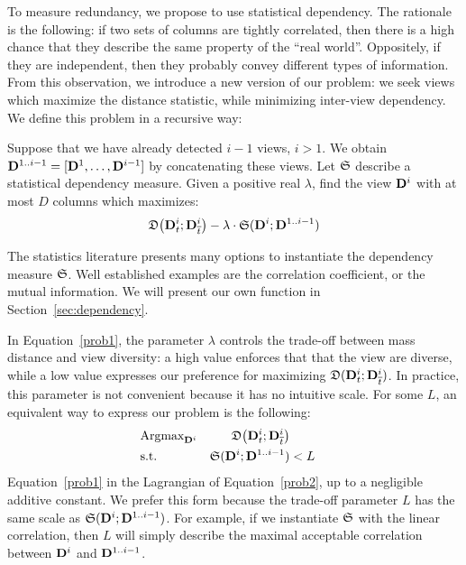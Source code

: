 To measure redundancy, we propose to use statistical dependency. The rationale
is the following: if two sets of columns are tightly correlated, then there is
a high chance that they describe the same property of the ``real world''.
Oppositely, if they are independent, then they probably convey different types
of information. From this observation, we introduce a new version of our
problem: we seek views which maximize the distance statistic, while minimizing
inter-view dependency.  We define this problem in a recursive way:
\begin{problem}
    Suppose that we have already detected $i-1$ views, $i > 1$. We obtain
    $\mathbf{D}^{1..i-1} =
    [\mathbf{D}^1, \ldots, \mathbf{D}^{i-1}]$ by concatenating these views. Let
    $\mathfrak{S}$ describe a statistical dependency measure. Given a
    positive real $\lambda$, find the view $\mathbf{D}^{i}$ with at most $D$
    columns which maximizes:
        \begin{equation}
            \label{prob1}
            \mathfrak{D}\big( \mathbf{D}^{i}_t  ; \mathbf{D}^{i}_{\overline{t}} \big) - 
            \lambda \cdot \mathfrak{S} ( \mathbf{D}^{i} ; \mathbf{D}^{1..i-1})
        \end{equation}
\end{problem}
The statistics literature presents many options to instantiate the dependency
measure $\mathfrak{S}$. Well established examples are the correlation coefficient, or
the mutual information. We will present our own function in
Section~\ref{sec:dependency}.

In Equation~\ref{prob1}, the parameter $\lambda$ controls the trade-off between
mass distance and view diversity: a high value enforces that that the view are
diverse, while a low value expresses our preference for maximizing $\mathfrak{D}(
\mathbf{D}^{i}_t  ; \mathbf{D}^{i}_{\overline{t}})$. In practice, this parameter is
not convenient because it has no intuitive scale. For some $L$, an
equivalent way to express our problem is the following:
\begin{equation}
    \label{prob2}
    \begin{aligned}
        & \text{Argmax}_{\mathbf{D}^{i}} 
            & \mathfrak{D}\big( \mathbf{D}^{i}_t  ; \mathbf{D}^{i}_{\overline{t}} \big)\\
        & \text{s.t.} 
        &\mathfrak{S} ( \mathbf{D}^{i} ; \mathbf{D}^{1..i-1}) & < L\\ 
    \end{aligned}
\end{equation}
Equation~\ref{prob1} in the Lagrangian of Equation~\ref{prob2}, up to a
negligible additive constant. We prefer this form because the trade-off
parameter $L$ has the same scale as $\mathfrak{S} ( \mathbf{D}^{i} ; \mathbf{D}^{1..i-1}) $.
For example, if we instantiate $\mathfrak{S}$ with the linear correlation, then $L$
will simply describe the maximal acceptable correlation between $\mathbf{D}^{i}$
and $\mathbf{D}^{1..i-1}$.

